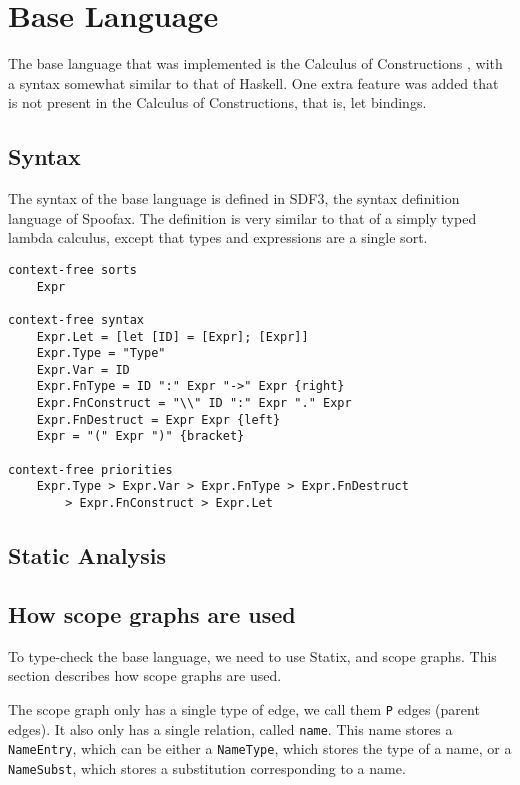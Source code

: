 
\chapter{\label{chap:baselang}Base Language}

The base language that was implemented is the Calculus of Constructions \autocite{Coquand_Huet_1988}, with a syntax somewhat similar to that of Haskell. One extra feature was added that is not present in the Calculus of Constructions, that is, let bindings.

\section{Syntax}

The syntax of the base language is defined in SDF3, the syntax definition language of Spoofax. The definition is very similar to that of a simply typed lambda calculus, except that types and expressions are a single sort. 

\begin{lstlisting}
context-free sorts
	Expr
	
context-free syntax
	Expr.Let = [let [ID] = [Expr]; [Expr]]
	Expr.Type = "Type"
	Expr.Var = ID
	Expr.FnType = ID ":" Expr "->" Expr {right}
	Expr.FnConstruct = "\\" ID ":" Expr "." Expr
	Expr.FnDestruct = Expr Expr {left}
	Expr = "(" Expr ")" {bracket}

context-free priorities
	Expr.Type > Expr.Var > Expr.FnType > Expr.FnDestruct 
		> Expr.FnConstruct > Expr.Let
\end{lstlisting}

\section{Static Analysis}


\section{How scope graphs are used}

To type-check the base language, we need to use Statix, and scope graphs. This section describes how scope graphs are used.

The scope graph only has a single type of edge, we call them \verb|P| edges (parent edges). It also only has a single relation, called \verb|name|. This name stores a \verb|NameEntry|, which can be either a \verb|NameType|, which stores the type of a name, or a \verb|NameSubst|, which stores a substitution corresponding to a name. 

